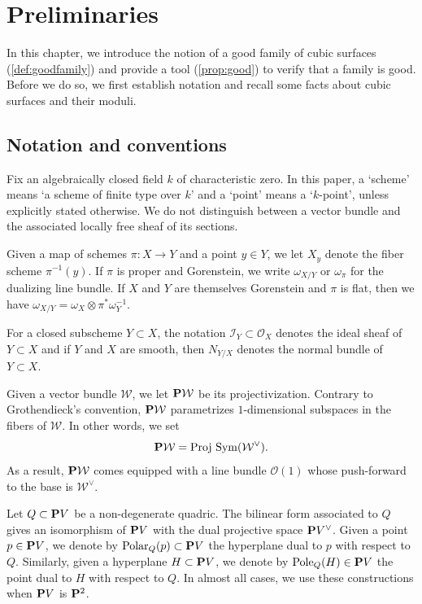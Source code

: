 \documentclass[reqno]{amsart}
\renewcommand{\k}{k}
\DeclareMathOperator{\Polar}{Polar}
\DeclareMathOperator{\Pole}{Pole}
\renewcommand{\to}{{\longrightarrow}}
\renewcommand {\P}{{\bf P}}
\providecommand{\Sym}{\operatorname{Sym}}
\numberwithin{equation}{section}
\renewcommand{\O}{\mathcal{O}}
\newcommand{\Proj}{{\text{\rm Proj}\,}}
\begin{document}


\section{Preliminaries}
\label{sec:good}

In this chapter, we introduce the notion of a good family of cubic
surfaces (\autoref{def:goodfamily}) and provide a tool
(\autoref{prop:good}) to verify that a family is good.  Before we do
so, we first establish notation and recall some facts about cubic surfaces and their moduli.
\subsection{Notation and conventions}
\label{sec:notation-conventions}
Fix an algebraically closed field $\k$ of characteristic zero.  In
this paper, a `scheme' means `a scheme of finite type over $\k$' and a
`point' means a `$\k$-point', unless explicitly stated otherwise.  We
do not distinguish between a vector bundle and the associated locally
free sheaf of its sections.

Given a map of schemes $\pi \colon X \to Y$ and a point $y \in Y$, we
let $X_y$ denote the fiber scheme $\pi^{-1}(y)$.  If $\pi$ is proper
and Gorenstein, we write $\omega_{X/Y}$ or $\omega_{\pi}$ for the
dualizing line bundle.  If $X$ and $Y$ are themselves Gorenstein and
$\pi$ is flat, then we have
$\omega_{X/Y} = \omega_X \otimes \pi^*\omega_Y^{-1}$.

For a closed subscheme $Y \subset X$, the notation $\mathcal{I}_Y \subset \O_X$ denotes the ideal sheaf of $Y \subset X$ and if $Y$ and $X$ are smooth, then $N_{Y/X}$ denotes the normal bundle of $Y \subset X$.

Given a vector bundle $\mathcal{W}$, we let $\P \mathcal{W}$ be its
projectivization.  Contrary to Grothendieck's convention,
$\P \mathcal{W}$ parametrizes $1$-dimensional subspaces in the fibers
of $\mathcal{W}$.  In other words, we set
\[ \P \mathcal{W} = \Proj \Sym(\mathcal{W}^{\vee}).\] As a result,
$\P \mathcal{W}$ comes equipped with a line bundle $\O(1)$ whose
push-forward to the base is $\mathcal{W}^{\vee}$.

Let $Q \subset \P V$ be a non-degenerate quadric.  The bilinear form
associated to $Q$ gives an isomorphism of $\P V$ with the dual
projective space $\P V^{\vee}$.  Given a point $p \in \P V$, we denote
by $\Polar_Q(p) \subset \P V$ the hyperplane dual to $p$ with respect to
$Q$. Similarly, given a hyperplane $H \subset \P V$, we denote by
$\Pole_Q(H) \in \P V$ the point dual to $H$ with respect to $Q$.  In
almost all cases, we use these constructions when $\P V$ is $\P^2$.
\end{document}

